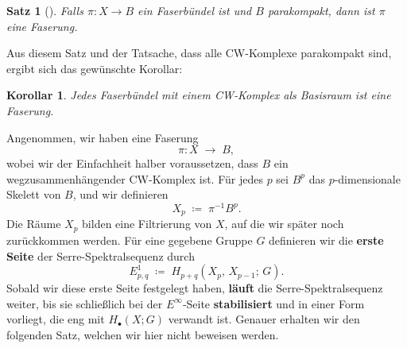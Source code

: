 \documentclass[12pt]{article}
\numberwithin{conj}{section}
\newtheorem{theorem}[conj]{Satz}
\newtheorem{corollary}[conj]{Korollar}
\begin{document}
    \begin{theorem}[{\cite[Theorem 1]{huebsch1955}}]
        Falls $\pi : X \to B$ ein Faserbündel ist und $B$ parakompakt, dann ist
        $\pi$ eine Faserung.
    \end{theorem}

    \noindent
    Aus diesem Satz und der Tatsache, dass alle CW-Komplexe parakompakt sind, ergibt
    sich das gewünschte Korollar:

    \begin{corollary}
        Jedes Faserbündel mit einem CW-Komplex als Basisraum ist eine Faserung.
    \end{corollary}

    \noindent
    Angenommen, wir haben eine Faserung
    \[
        \pi: X \;\longrightarrow\; B,
    \]
    wobei wir der Einfachheit halber voraussetzen, dass $B$ ein
    wegzusammenhängender CW-Komplex ist. Für jedes $p$ sei $B^{p}$ das $p$-dimensionale
    Skelett von $B$, und wir definieren
    \[
        X_{p} \;\coloneqq\; \pi^{-1} B^{p} .
    \]
    Die Räume $X_{p}$ bilden eine Filtrierung von $X$, auf die wir später noch zurückkommen
    werden. Für eine gegebene Gruppe $G$ definieren wir die \textbf{erste Seite} der
    Serre-Spektralsequenz durch
    \[
        E^{1}_{p,q}\;\coloneqq\; H_{p+q}(X_{p},\,X_{p-1};\,G).
    \]
    Sobald wir diese erste Seite festgelegt haben, \textbf{läuft} die Serre-Spektralsequenz
    weiter, bis sie schließlich bei der $E^{\infty}$-Seite \textbf{stabilisiert} und
    in einer Form vorliegt, die eng mit $H_{\bullet}(X;G)$ verwandt ist. Genauer erhalten
    wir den folgenden Satz, welchen wir hier nicht beweisen werden.
\end{document}
